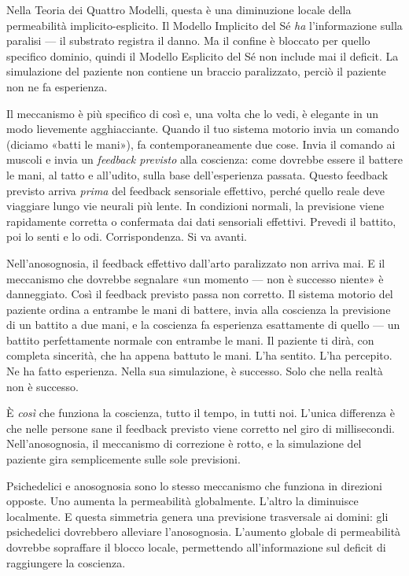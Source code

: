 \documentclass[11pt, twoside, openright]{book}
\begin{document}
Nella Teoria dei Quattro Modelli, questa è una diminuzione locale della permeabilità implicito-esplicito. Il Modello Implicito del Sé \textit{ha} l'informazione sulla paralisi --- il substrato registra il danno. Ma il confine è bloccato per quello specifico dominio, quindi il Modello Esplicito del Sé non include mai il deficit. La simulazione del paziente non contiene un braccio paralizzato, perciò il paziente non ne fa esperienza.

Il meccanismo è più specifico di così e, una volta che lo vedi, è elegante in un modo lievemente agghiacciante. Quando il tuo sistema motorio invia un comando (diciamo «batti le mani»), fa contemporaneamente due cose. Invia il comando ai muscoli e invia un \textit{feedback previsto} alla coscienza: come dovrebbe essere il battere le mani, al tatto e all'udito, sulla base dell'esperienza passata. Questo feedback previsto arriva \textit{prima} del feedback sensoriale effettivo, perché quello reale deve viaggiare lungo vie neurali più lente. In condizioni normali, la previsione viene rapidamente corretta o confermata dai dati sensoriali effettivi. Prevedi il battito, poi lo senti e lo odi. Corrispondenza. Si va avanti.

Nell'anosognosia, il feedback effettivo dall'arto paralizzato non arriva mai. E il meccanismo che dovrebbe segnalare «un momento --- non è successo niente» è danneggiato. Così il feedback previsto passa non corretto. Il sistema motorio del paziente ordina a entrambe le mani di battere, invia alla coscienza la previsione di un battito a due mani, e la coscienza fa esperienza esattamente di quello --- un battito perfettamente normale con entrambe le mani. Il paziente ti dirà, con completa sincerità, che ha appena battuto le mani. L'ha sentito. L'ha percepito. Ne ha fatto esperienza. Nella sua simulazione, è successo. Solo che nella realtà non è successo.

È \textit{così} che funziona la coscienza, tutto il tempo, in tutti noi. L'unica differenza è che nelle persone sane il feedback previsto viene corretto nel giro di millisecondi. Nell'anosognosia, il meccanismo di correzione è rotto, e la simulazione del paziente gira semplicemente sulle sole previsioni.

Psichedelici e anosognosia sono lo stesso meccanismo che funziona in direzioni opposte. Uno aumenta la permeabilità globalmente. L'altro la diminuisce localmente. E questa simmetria genera una previsione trasversale ai domini: gli psichedelici dovrebbero alleviare l'anosognosia. L'aumento globale di permeabilità dovrebbe sopraffare il blocco locale, permettendo all'informazione sul deficit di raggiungere la coscienza.
\end{document}
